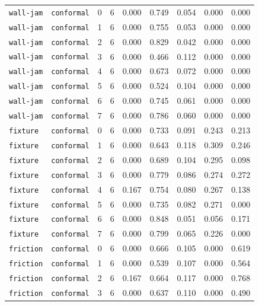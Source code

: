 \documentclass{article}
\begin{document}
\begin{center}
\begin{tabular}{lllcccccc}
\texttt{wall-jam} & \texttt{conformal} & 0 & 6 & 0.000 & 0.749 & 0.054 & 0.000 & 0.000 \\
\texttt{wall-jam} & \texttt{conformal} & 1 & 6 & 0.000 & 0.755 & 0.053 & 0.000 & 0.000 \\
\texttt{wall-jam} & \texttt{conformal} & 2 & 6 & 0.000 & 0.829 & 0.042 & 0.000 & 0.000 \\
\texttt{wall-jam} & \texttt{conformal} & 3 & 6 & 0.000 & 0.466 & 0.112 & 0.000 & 0.000 \\
\texttt{wall-jam} & \texttt{conformal} & 4 & 6 & 0.000 & 0.673 & 0.072 & 0.000 & 0.000 \\
\texttt{wall-jam} & \texttt{conformal} & 5 & 6 & 0.000 & 0.524 & 0.104 & 0.000 & 0.000 \\
\texttt{wall-jam} & \texttt{conformal} & 6 & 6 & 0.000 & 0.745 & 0.061 & 0.000 & 0.000 \\
\texttt{wall-jam} & \texttt{conformal} & 7 & 6 & 0.000 & 0.786 & 0.060 & 0.000 & 0.000 \\
\texttt{fixture} & \texttt{conformal} & 0 & 6 & 0.000 & 0.733 & 0.091 & 0.243 & 0.213 \\
\texttt{fixture} & \texttt{conformal} & 1 & 6 & 0.000 & 0.643 & 0.118 & 0.309 & 0.246 \\
\texttt{fixture} & \texttt{conformal} & 2 & 6 & 0.000 & 0.689 & 0.104 & 0.295 & 0.098 \\
\texttt{fixture} & \texttt{conformal} & 3 & 6 & 0.000 & 0.779 & 0.086 & 0.274 & 0.272 \\
\texttt{fixture} & \texttt{conformal} & 4 & 6 & 0.167 & 0.754 & 0.080 & 0.267 & 0.138 \\
\texttt{fixture} & \texttt{conformal} & 5 & 6 & 0.000 & 0.735 & 0.082 & 0.271 & 0.000 \\
\texttt{fixture} & \texttt{conformal} & 6 & 6 & 0.000 & 0.848 & 0.051 & 0.056 & 0.171 \\
\texttt{fixture} & \texttt{conformal} & 7 & 6 & 0.000 & 0.799 & 0.065 & 0.226 & 0.000 \\
\texttt{friction} & \texttt{conformal} & 0 & 6 & 0.000 & 0.666 & 0.105 & 0.000 & 0.619 \\
\texttt{friction} & \texttt{conformal} & 1 & 6 & 0.000 & 0.539 & 0.107 & 0.000 & 0.564 \\
\texttt{friction} & \texttt{conformal} & 2 & 6 & 0.167 & 0.664 & 0.117 & 0.000 & 0.768 \\
\texttt{friction} & \texttt{conformal} & 3 & 6 & 0.000 & 0.637 & 0.110 & 0.000 & 0.490 \\
\bottomrule
\end{tabular}
\end{center}
\end{document}
